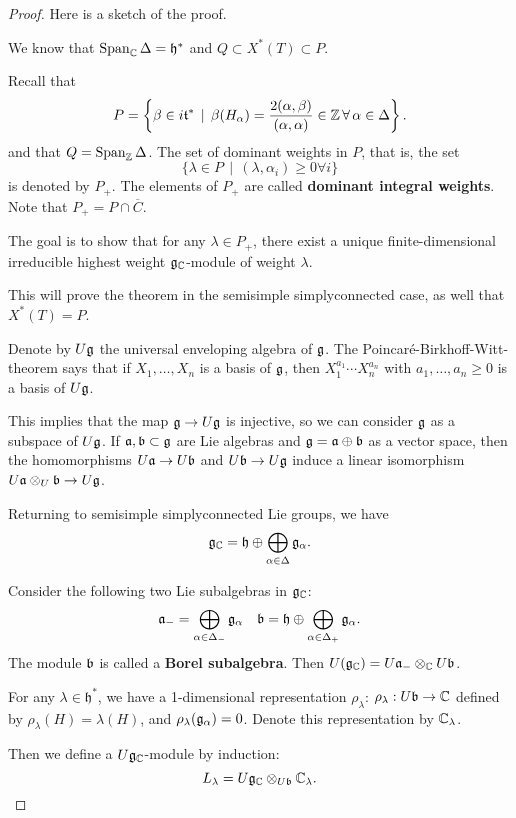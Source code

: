 \documentclass[11pt, english]{article}
\begin{document}
\begin{proof}
Here is a sketch of the proof.

We know that $\operatorname{Span}_{\mathbb{C}} \Delta = \mathfrak h^\ast$ and $Q \subset X^\ast(T) \subset P$. 

Recall that 
$$
P = \left\{ \beta \in i \mathfrak t^\ast \, \mid \, \beta(H_\alpha)=\frac{2(\alpha,\beta)}{(\alpha,\alpha)} \in \mathbb{Z} \, \forall \, \alpha \in \Delta \right\}.
$$
and that $Q = \operatorname{Span}_{\mathbb{Z}} \Delta$. The set of dominant weights in $P$, that is, the set 
$$
\{ \lambda \in P \, \mid \, (\lambda,\alpha_i) \geq 0 \forall i \}
$$
is denoted by $P_+$. The elements of $P_+$ are called \textbf{dominant integral weights}. Note that $P_+ = P \cap \overline C$.

The goal is to show that for any $\lambda \in P_+$, there exist a unique finite-dimensional irreducible highest weight $\mathfrak g_{\mathbb{C}}$-module of weight $\lambda$. 

This will prove the theorem in the semisimple simplyconnected case, as well that $X^\ast(T)=P$.

Denote by $U\mathfrak g$ the universal enveloping algebra of $\mathfrak g$. The Poincaré-Birkhoff-Witt-theorem says that if $X_1,\ldots,X_n$ is a basis of $\mathfrak g$, then $X_1^{a_1}\cdots X_n^{a_n}$ with $a_1, \ldots,a_n \geq 0$ is a basis of $U\mathfrak g$.

This implies that the map $\mathfrak g \to U\mathfrak g$ is injective, so we can consider $\mathfrak g$ as a subspace of $U\mathfrak g$. If $\mathfrak{a}, \mathfrak{b} \subset \mathfrak g$ are Lie algebras and $\mathfrak g = \mathfrak{a} \oplus \mathfrak{b}$ as a vector space, then the homomorphisms $U\mathfrak{a} \to U\mathfrak{b} $ and  $U\mathfrak{b} \to U\mathfrak g$ induce a linear isomorphism $U\mathfrak{a} \otimes_ U\mathfrak{b} \to U \mathfrak g$.

Returning to semisimple simplyconnected Lie groups, we have 
$$
\mathfrak g_{\mathbb{C}} = \mathfrak h \oplus \bigoplus_{\alpha \in \Delta} \mathfrak g_\alpha.
$$

Consider the following two Lie subalgebras in $\mathfrak g_{\mathbb{C}}$:
\begin{align*}
  \mathfrak{a}_- = \bigoplus_{\alpha \in \Delta_-} \mathfrak g_\alpha && \mathfrak{b} = \mathfrak h \oplus \bigoplus_{\alpha \in \Delta_+} \mathfrak g_\alpha.
\end{align*}
The module $\mathfrak{b}$ is called a \textbf{Borel subalgebra}. Then $U(\mathfrak g_{\mathbb{C}}) = U\mathfrak{a}_- \otimes_{\mathbb{C}} U \mathfrak{b}$. 

For any $\lambda \in \mathfrak h^\ast$, we have a 1-dimensional representation $\rho_\lambda$: $\rho_\lambda:U\mathfrak{b} \to \mathbb{C}$ defined by $\rho_\lambda(H)=\lambda(H)$, and $\rho_\lambda(\mathfrak g_\alpha) = 0$. Denote this representation by $\mathbb{C}_\lambda$.

Then we define a $U \mathfrak g_{\mathbb{C}}$-module by induction:
$$
L_\lambda = U \mathfrak g_{\mathbb{C}} \otimes_{U\mathfrak{b}} \mathbb{C}_\lambda.
$$


\end{proof}
\end{document}
